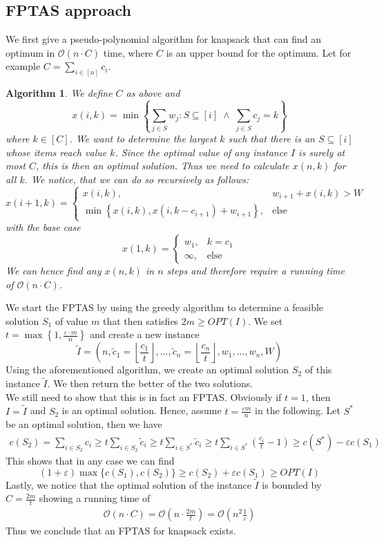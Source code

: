 \documentclass[a4paper, 12pt]{article}
\newtheorem{alg}{Algorithm}[section]
\begin{document}
	\subsection{FPTAS approach}
	We first give a pseudo-polynomial algorithm for knapsack that can find an optimum in $\mathcal{O}(n \cdot C)$ time, where $C$ is an upper bound for the optimum. Let for example $C = \sum_{i \in [n]} c_i$. \begin{alg}
		We define $C$ as above and \[x(i,k) = \min \left\{\sum_{j \in S} w_j : S\subseteq [i] \; \land \; \sum_{j \in S} c_j = k\right\}\]
		where $k \in [C]$. We want to determine the largest $k$ such that there is an $S \subseteq [i]$ whose items reach value $k$. Since the optimal value of any instance $I$ is surely at most $C$, this is then an optimal solution. Thus we need to calculate $x(n,k)$ for all $k$. We notice, that we can do so recursively as follows: \[x(i+1,k) = \begin{cases}
			x(i,k), & w_{i+1} + x(i,k) > W\\
			\min\left\{x(i,k), x(i,k-c_{i+1}) + w_{i+1}\right\}, & \text{else} 
		\end{cases}\]
	with the base case \[x(1,k) = \begin{cases}
		w_1, & k = c_1\\
		\infty, & \text{else}
	\end{cases}\]
	We can hence find any $x(n,k)$ in $n$ steps and therefore require a running time of $\mathcal{O}(n\cdot C)$.
	\end{alg}
	We start the FPTAS by using the greedy algorithm to determine a feasible solution $S_1$ of value $m$ that then satisfies $2m \geq OPT(I)$. We set $t = \max\left\{1, \frac{\varepsilon\cdot m}{n}\right\}$ and create a new instance \[\tilde{I} = (n, \tilde{c}_1 = \left\lfloor\frac{c_1}{t}\right\rfloor, ..., \tilde{c}_n = \left\lfloor \frac{c_n}{t}\right\rfloor, w_1,...,w_n,W)\]
	Using the aforementioned algorithm, we create an optimal solution $S_2$ of this instance $\tilde{I}$. We then return the better of the two solutions.\\
	We still need to show that this is in fact an FPTAS. Obviously if $t = 1$, then $I = \tilde{I}$ and $S_2$ is an optimal solution. Hence, assume $t = \frac{\varepsilon m}{n}$ in the following. Let $S^*$ be an optimal solution, then we have \begin{align}
		c(S_2) = \sum_{i \in S_2} c_i \geq t\sum_{i \in S_2}\tilde{c}_i \geq t \sum_{i \in S^*} \tilde{c}_i \geq t \sum_{i \in S^*}\left(\frac{c_i}{t}-1\right) \geq c(S^*)-\varepsilon c(S_1)
	\end{align}
	This shows that in any case we can find \[(1+\varepsilon)\max\{c(S_1),c(S_2)\} \geq c(S_2) + \varepsilon c(S_1) \geq OPT(I)\]
	Lastly, we notice that the optimal solution of the instance $\tilde{I}$ is bounded by $C = \frac{2m}{t}$ showing a running time of \begin{align}
		\mathcal{O}(n\cdot C) = \mathcal{O}\left(n \cdot \frac{2m}{t}\right) = \mathcal{O}\left(n^2\frac{1}{\varepsilon}\right)
	\end{align}
	Thus we conclude that an FPTAS for knapsack exists.
\end{document}
